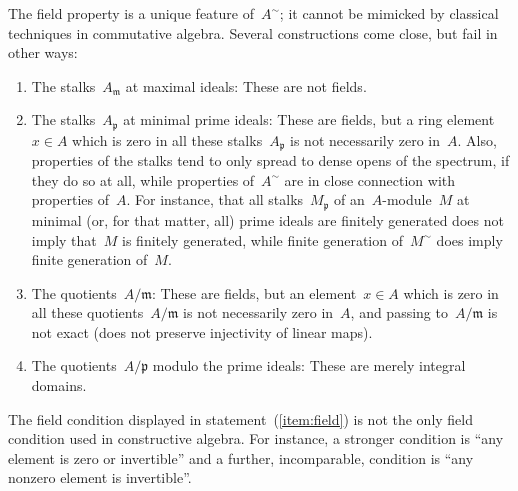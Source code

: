 \documentclass{ws-rv9x6}
\newcommand{\ppp}{\mathfrak{p}}
\newcommand{\mmm}{\mathfrak{m}}
\renewcommand{\_}{\mathpunct{.}}
\newcommand{\?}{\,{:}\,}
\begin{document}
The field property is a unique feature of~$A^\sim$; it cannot be mimicked by
classical techniques in commutative algebra. Several constructions come close,
but fail in other ways:
\begin{enumerate}
\item The stalks~$A_\mmm$ at maximal ideals: These are not fields.
\item The stalks~$A_\ppp$ at minimal prime ideals: These are fields, but a ring
element~$x \in A$ which is zero in all these stalks~$A_\ppp$ is not necessarily
zero in~$A$. Also, properties of the stalks tend to only spread to
dense opens of the spectrum, if they do so at all, while properties of~$A^\sim$
are in close connection with properties of~$A$. For instance, that all
stalks~$M_\ppp$ of an~$A$-module~$M$ at minimal (or, for that matter, all) prime ideals are finitely
generated does not imply that~$M$ is finitely generated, while finite
generation of~$M^\sim$ does imply finite generation of~$M$.
\item The quotients~$A/\mmm$: These are fields, but an element~$x \in A$ which is
zero in all these quotients~$A/\mmm$ is not necessarily zero in~$A$, and
passing to~$A/\mmm$ is not exact (does not preserve injectivity of linear
maps).
\item The quotients~$A/\ppp$ modulo the prime ideals: These are merely integral
domains.
\end{enumerate}

The field condition displayed in statement~(\ref{item:field}) is not the only
field condition used in constructive algebra. For instance, a stronger condition
is ``any element is zero or invertible'' and a further, incomparable, condition
is ``any nonzero element is invertible''.
\end{document}
